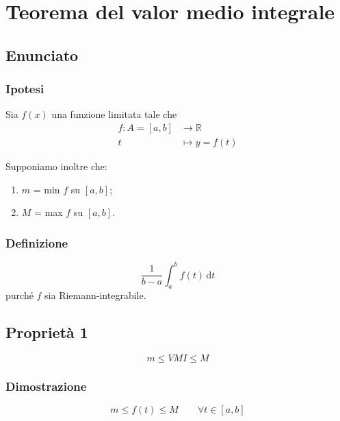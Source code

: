 \documentclass[../../dimostrazioni]{subfiles}
\begin{document}
    \chapter{Teorema del valor medio integrale}
    \label{teoValorMedioIntegrale}

    \section*{Enunciato}

        \subsection*{Ipotesi}

            Sia \(f(x)\) una funzione limitata tale che
            \begin{align*}
                f : A = [a, b] &\longrightarrow \mathbb{R}\\
                t &\longmapsto y = f(t) 
            \end{align*}

            Supponiamo inoltre che:

                \begin{enumerate}
                    \indentitem \item \(m\) = min \(f\) su \([a, b]\);
                    \indentitem \item \(M\) = max \(f\) su \([a, b]\).
                \end{enumerate}  

        \subsection*{Definizione}

            \[ \frac{1}{b-a} \int_{a}^{b} \! f(t) \, \mathrm{d} t \]
            purché \(f\) sia Riemann-integrabile.

    \section*{Proprietà 1}

        \[ m \leqslant VMI \leqslant M \]

        \subsection*{Dimostrazione}
    
            \[m \leqslant f(t) \leqslant M  \qquad \forall t \in [a, b] \]
\end{document}
